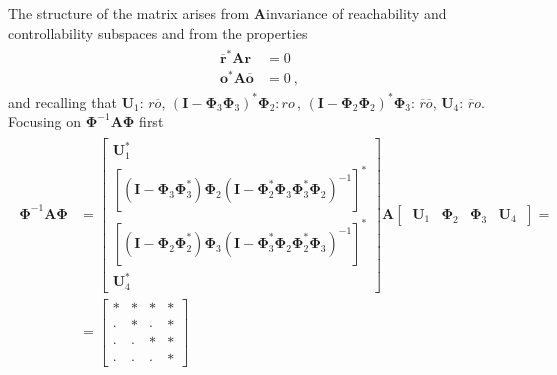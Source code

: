 \documentclass[letterpaper,10pt,english]{jupyterBook}
\begin{document}
\sphinxAtStartPar
The structure of the matrix arises from \(\mathbf{A}\)\sphinxhyphen{}invariance of reachability and controllability sub\sphinxhyphen{}spaces and from the properties
\begin{equation*}
\begin{split}\begin{aligned}
  \overline{\mathbf{r}}^* \mathbf{A} \mathbf{r} & = 0 \\
            \mathbf{o}^*  \mathbf{A} \overline{\mathbf{o}} & = 0 \ ,
\end{aligned}\end{split}
\end{equation*}
\sphinxAtStartPar
and recalling that \(\mathbf{U}_1: \, r \overline{o}\), \((\mathbf{I}-\boldsymbol\Phi_3 \boldsymbol\Phi_3)^* \boldsymbol\Phi_2: r o \, \), \((\mathbf{I}-\boldsymbol\Phi_2 \boldsymbol\Phi_2)^* \boldsymbol\Phi_3: \, \overline{r} \overline{o}\), \(\mathbf{U}_4: \, \overline{r} o\).
Focusing on \(\boldsymbol\Phi^{-1} \mathbf{A} \boldsymbol\Phi\) first
\begin{equation*}
\begin{split}\begin{aligned}
  \boldsymbol\Phi^{-1} \mathbf{A} \boldsymbol\Phi 
  & = 
\begin{bmatrix}
  \mathbf{U}_1^* \\
  \left[ \left( \mathbf{I} - \boldsymbol\Phi_3 \boldsymbol\Phi_3^* \right) \boldsymbol\Phi_2 \left( \mathbf{I} - \boldsymbol\Phi_2^* \boldsymbol\Phi_3 \boldsymbol\Phi_3^* \boldsymbol\Phi_2 \right)^{-1} \right]^* \\
  \left[ \left( \mathbf{I} - \boldsymbol\Phi_2 \boldsymbol\Phi_2^* \right) \boldsymbol\Phi_3 \left( \mathbf{I} - \boldsymbol\Phi_3^* \boldsymbol\Phi_2 \boldsymbol\Phi_2^* \boldsymbol\Phi_3 \right)^{-1} \right]^* \\
  \mathbf{U}_4^* 
\end{bmatrix} 
\mathbf{A}
\begin{bmatrix} \ \mathbf{U}_1 & \boldsymbol\Phi_2 & \boldsymbol\Phi_3 & \mathbf{U}_4 \ \end{bmatrix} = \\
  & = 
  \begin{bmatrix}
    \ast  & \ast  & \ast  & \ast  \\
    \cdot & \ast  & \cdot & \ast  \\
    \cdot & \cdot & \ast  & \ast  \\
    \cdot & \cdot & \cdot & \ast 
  \end{bmatrix}
\end{aligned}\end{split}
\end{equation*}
\end{document}
